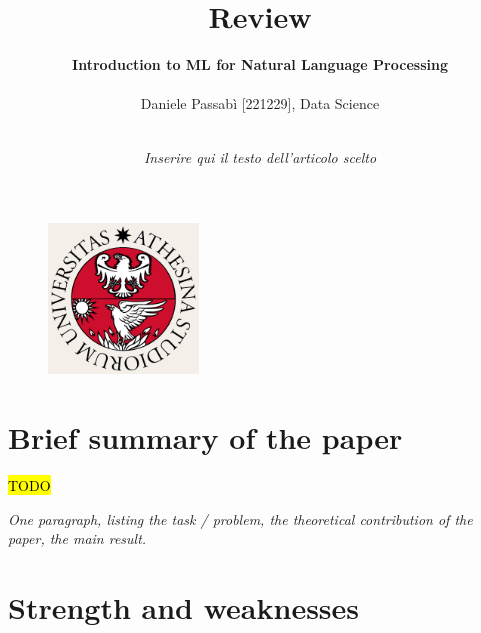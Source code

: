 \documentclass[letterpaper,11pt]{article}
\begin{document}
\pagecolor{ivory}

\title{\textbf{Review}}
\author{\textbf{Introduction to ML for Natural Language Processing}\\ \\ Daniele Passabì [221229], Data Science\\}

\date{\textit{\\Inserire qui il testo dell'articolo scelto}}
\maketitle
\thispagestyle{empty}

\begin{figure}[H] 
  \centering
  \includegraphics[width=4cm]{logo.png}
\end{figure}

\newpage
\pagecolor{white}
\setcounter{tocdepth}{2}
\tableofcontents
\thispagestyle{empty}

\newpage
\clearpage
{}




\section{Brief summary of the paper}

\hl{TODO}

\textit{One paragraph, listing the task / problem, the theoretical contribution of the paper, the main result.}



\section{Strength and weaknesses}
\end{document}
